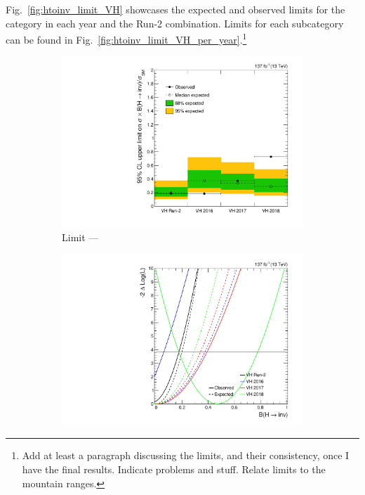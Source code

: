 Fig.~\ref{fig:htoinv_limit_VH} showcases the expected and observed limits for the \VH category in each year and the Run-2 combination. Limits for each subcategory can be found in Fig.~\ref{fig:htoinv_limit_VH_per_year}.\footnote{Add at least a paragraph discussing the limits, and their consistency, once I have the final results. Indicate problems and stuff. Relate limits to the mountain ranges.}

\begin{figure}[htbp]
    \centering
    \begin{subfigure}[b]{0.45\textwidth}
        \includegraphics[width=\textwidth]{figures/limits/VH/limit_Run2_VH.pdf}
        \caption{Limit --- \VH}
    \end{subfigure}
    \hspace{0.05\textwidth}
    \begin{subfigure}[t]{0.45\textwidth}
        \includegraphics[width=\textwidth]{figures/likelihood_scan/profile_likelihood_scan_Run2_VH.pdf}

\end{subfigure}
\end{figure}
